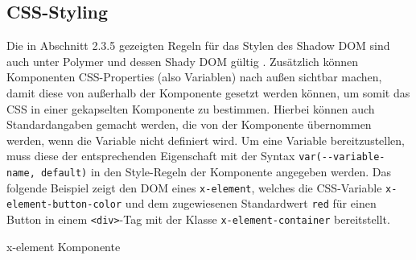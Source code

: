 \begin{Shaded}
\begin{Highlighting}[]
 \OperatorTok{=} \NormalTok{(}\VariableTok{$}\NormalTok{(}\OperatorTok{\{}
  \NormalTok{(}\NormalTok{)}\OperatorTok{;}
  \NormalTok{(}\NormalTok{)}\OperatorTok{;}
\OperatorTok{\}}\NormalTok{)}\OperatorTok{;}
\end{Highlighting}
\end{Shaded}


\subsection{CSS-Styling}\label{css-styling}

Die in Abschnitt 2.3.5 gezeigten Regeln für das Stylen des Shadow DOM sind auch unter Polymer und dessen Shady DOM gültig \cite{citeulike:13915080}. Zusätzlich können Komponenten CSS-Properties (also Variablen) nach außen sichtbar machen, damit diese von außerhalb der Komponente gesetzt werden können, um somit das CSS in einer gekapselten Komponente zu bestimmen. Hierbei können auch Standardangaben gemacht werden, die von der Komponente übernommen werden, wenn die Variable nicht definiert wird. Um eine Variable bereitzustellen, muss diese der entsprechenden Eigenschaft mit der Syntax \texttt{var(-\/-variable-name,\ default)} in den Style-Regeln der Komponente angegeben werden. Das folgende Beispiel zeigt den DOM eines \texttt{x-element}, welches die CSS-Variable \texttt{x-element-button-color} und dem zugewiesenen Standardwert \texttt{red} für einen Button in einem \texttt{\textless{}div\textgreater{}}-Tag mit der Klasse \texttt{x-element-container} bereitstellt.

x-element Komponente

\begin{Shaded}
\begin{Highlighting}[]
\KeywordTok{>}
       \KeywordTok{\{}
         \NormalTok{)}\KeywordTok{;}
      \KeywordTok{\}}
    \KeywordTok{>}
\end{Highlighting}
\end{Shaded}


